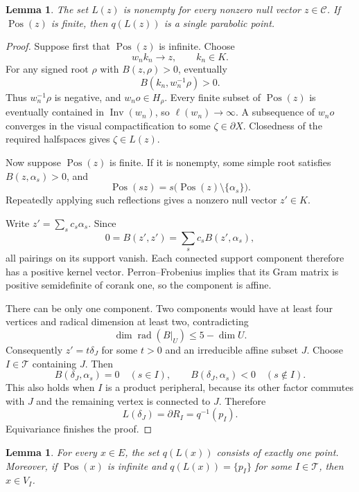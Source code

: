 \documentclass[11pt,reqno]{amsart}
\DeclareMathOperator{\Inv}{Inv}
\theoremstyle{plain}
\newtheorem{lemma}[theorem]{Lemma}
\theoremstyle{definition}
\theoremstyle{remark}
\numberwithin{equation}{section}
\DeclareMathOperator{\Pos}{Pos}
\begin{document}
\begin{lemma}\label{lem:32-nonempty}
The set $L(z)$ is nonempty for every nonzero null vector
$z\in\mathcal C$.
If $\Pos(z)$ is finite, then $q(L(z))$ is a single
parabolic point.
\end{lemma}

\begin{proof}
Suppose first that $\Pos(z)$ is infinite.
Choose
\[
    w_nk_n\longrightarrow z,\qquad k_n\in K.
\]
For any signed root $\rho$ with $B(z,\rho)>0$,
eventually
\[
    B(k_n,w_n^{-1}\rho)>0.
\]
Thus $w_n^{-1}\rho$ is negative, and $w_no\in H_\rho$.
Every finite subset of $\Pos(z)$ is eventually contained
in $\Inv(w_n)$, so $\ell(w_n)\to\infty$.
A subsequence of $w_no$ converges in the visual
compactification to some $\zeta\in\partial X$.
Closedness of the required halfspaces gives
$\zeta\in L(z)$.

Now suppose $\Pos(z)$ is finite.
If it is nonempty, some simple root satisfies
$B(z,\alpha_s)>0$, and
\[
    \Pos(sz)=s\bigl(\Pos(z)\setminus\{\alpha_s\}\bigr).
\]
Repeatedly applying such reflections gives a nonzero
null vector $z'\in K$.

Write $z'=\sum_s c_s\alpha_s$.
Since
\[
    0=B(z',z')=\sum_s c_sB(z',\alpha_s),
\]
all pairings on its support vanish.
Each connected support component therefore has a positive
kernel vector.
Perron--Frobenius implies that its Gram matrix is positive
semidefinite of corank one, so the component is affine.

There can be only one component.
Two components would have at least four vertices and
radical dimension at least two, contradicting
\[
    \dim\operatorname{rad}(B|_U)\leq5-\dim U.
\]
Consequently $z'=t\delta_J$ for some $t>0$ and an
irreducible affine subset $J$.
Choose $I\in\mathcal T$ containing $J$.
Then
\[
    B(\delta_J,\alpha_s)=0\quad(s\in I),
    \qquad
    B(\delta_J,\alpha_s)<0\quad(s\notin I).
\]
This also holds when $I$ is a product peripheral,
because its other factor commutes with $J$ and the
remaining vertex is connected to $J$.
Therefore
\[
    L(\delta_J)=\partial R_I=q^{-1}(p_I).
\]
Equivariance finishes the proof.
\end{proof}

\begin{lemma}\label{lem:32-unique-image}
For every $x\in E$, the set $q(L(x))$ consists of exactly
one point. Moreover, if $\Pos(x)$ is infinite and
$q(L(x))=\{p_I\}$ for some $I\in\mathcal T$, then $x\in V_I$.
\end{lemma}
\end{document}
